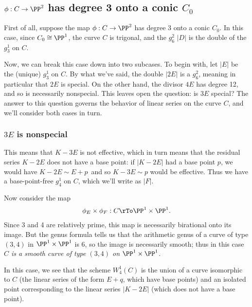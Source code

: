 \subsection{$\phi : C \to \PP^2$ has degree 3 onto a conic $C_0$}

First of all, suppose the map $\phi : C \to \PP^2$ has degree 3 onto a conic $C_0$. In this case, since $C_0 \cong \PP^1$, the curve $C$ is trigonal, and the $g^2_6$ $|D|$ is the double of the $g^1_3$ on $C$. 

Now, we can break this case down into two subcases. To begin with, let $|E|$ be the (unique) $g^1_3$ on $C$. By what we've said, the double $|2E|$ is a $g^2_6$, meaning in particular that $2E$ is special. On the other hand, the divisor $4E$ has degree 12, and so is necessarily nonspecial. This leaves open the question: is $3E$ special? The answer to this question governs the behavior of linear series on the curve $C$, and we'll consider both cases in turn.

\subsubsection{$3E$ is nonspecial} This means that $K-3E$ is not effective, which in turn means that the residual series $K-2E$ does not have a base point: if $|K-2E|$ had a base point $p$, we would have $K - 2E \sim E + p$\, and so $K-3E \sim p$ would be effective. Thus we have a base-point-free $g^1_4$ on $C$, which we'll write as $|F|$.

Now consider the map
$$
\phi_E \times \phi_F : C \rTo \PP^1 \times \PP^1.
$$
Since 3 and 4 are relatively prime, this map is necessarily birational onto its image. But the genus formula tells us that the arithmetic genus of a curve of type $(3,4)$ in $\PP^1 \times \PP^1$ is 6, so the image is necessarily smooth; thus in this case \emph{$C$ is a smooth curve of type $(3,4)$ on $\PP^1 \times \PP^1$}.

In this case, we see that the scheme $W^1_4(C)$ is the union of a curve isomorphic to $C$ (the linear series of the form $E + q$, which have base points) and an isolated point corresponding to the linear series $|K - 2E|$ (which does not have a base point).

